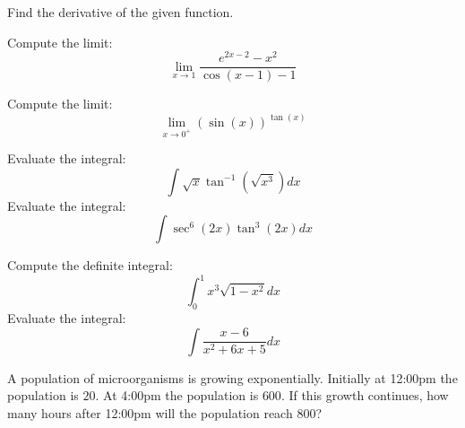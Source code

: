 \documentclass[11pt]{exam}
\begin{document}
\begin{questions}

\newpage



\question %
Find the derivative of the given function.
\newpage

\question[8] %
Compute the limit:
$$\lim_{x\to 1}\frac{e^{2x-2}-x^2}{\cos(x-1)-1}$$
\newpage

\question[8] %
Compute the limit:
$$\lim_{x\to 0^+}(\sin(x))^{\tan(x)}$$
\newpage

\question[8] %
Evaluate the integral:
$$\int\sqrt{x}\tan^{-1}(\sqrt{x^3})dx$$
\newpage
\question[8] %
Evaluate the integral:
$$\int\sec^6(2x)\tan^{3}(2x)dx$$
\newpage

\question[12] %
Compute the definite integral:
$$\int_0^1x^3\sqrt{1-x^2}dx$$
\newpage
\question[8] %
Evaluate the integral:
$$\int\frac{x-6}{x^2+6x+5}dx$$
\newpage



\begin{comment}
\question[8] 

A pirate captain finds two treasure chests, one filled with $500$ pounds of gold, and one filled with $100$ pounds of silver. The captain realizes each chest has its own magical powers. The chest of gold is cursed, so if left alone, the amount of gold in the chest decays exponentially by $10\%$ per day. On the other hand, the amount of silver when left alone increases exponentially by $5\%$ per day. How many days after finding them before the chests weigh the same?
\end{comment}
\question[8] A population of microorganisms is growing exponentially. Initially at 12:00pm the population is $20$. At 4:00pm the population is $600$. If this growth continues, how many hours after 12:00pm will the population reach $800$?




\end{questions}
\end{document}
